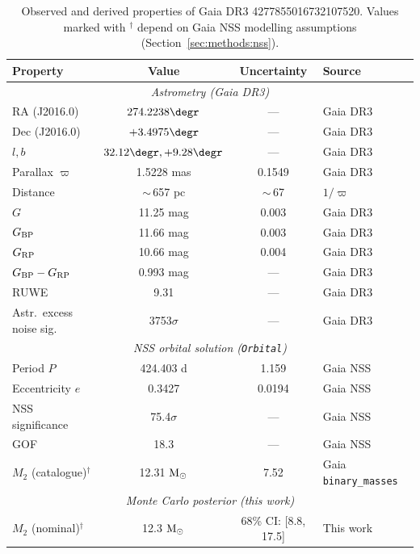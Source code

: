 \documentclass[usenatbib,fleqn]{mnras}
\newcommand{\Msun}{{\rm M}_\odot}
\begin{document}
\begin{table}
\centering
\caption{Observed and derived properties of
Gaia DR3 4277855016732107520.
Values marked with $^\dagger$ depend on Gaia NSS modelling
assumptions (Section~\ref{sec:methods:nss}).}
\label{tab:observed}
\begin{tabular}{lccl}
\toprule
Property & Value & Uncertainty & Source \\
\midrule
\multicolumn{4}{c}{\textit{Astrometry (Gaia DR3)}} \\
RA (J2016.0)           & $274.2238\degr$     & ---      & Gaia DR3 \\
Dec (J2016.0)          & $+3.4975\degr$      & ---      & Gaia DR3 \\
$l, b$                 & $32.12\degr, +9.28\degr$ & --- & Gaia DR3 \\
Parallax $\varpi$      & 1.5228 mas          & 0.1549   & Gaia DR3 \\
Distance               & $\sim$\,657 pc      & $\sim$\,67 & $1/\varpi$ \\
$G$                    & 11.25 mag           & 0.003    & Gaia DR3 \\
$G_{\rm BP}$           & 11.66 mag           & 0.003    & Gaia DR3 \\
$G_{\rm RP}$           & 10.66 mag           & 0.004    & Gaia DR3 \\
$G_{\rm BP} - G_{\rm RP}$ & 0.993 mag        & ---      & Gaia DR3 \\
RUWE                   & 9.31                & ---      & Gaia DR3 \\
Astr.\ excess noise sig.\ & 3753$\sigma$     & ---      & Gaia DR3 \\
\midrule
\multicolumn{4}{c}{\textit{NSS orbital solution (\texttt{Orbital})}} \\
Period $P$               & 424.403 d           & 1.159    & Gaia NSS \\
Eccentricity $e$         & 0.3427              & 0.0194   & Gaia NSS \\
NSS significance         & 75.4$\sigma$        & ---      & Gaia NSS \\
GOF                      & 18.3                & ---      & Gaia NSS \\
$M_2$ (catalogue)$^\dagger$ & 12.31 $\Msun$   & 7.52     & Gaia \texttt{binary\_masses} \\
\midrule
\multicolumn{4}{c}{\textit{Monte Carlo posterior (this work)}} \\
$M_2$ (nominal)$^\dagger$ & 12.3 $\Msun$  & 68\% CI: [8.8, 17.5]  & This work \\

\end{tabular}
\end{table}
\end{document}
